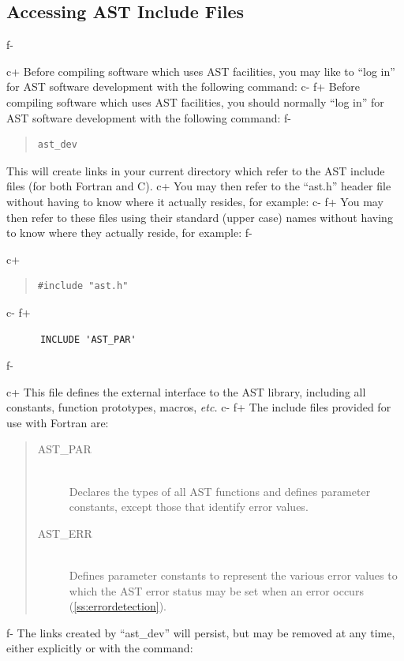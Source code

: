\documentclass[twoside,11pt]{article}
\newcommand{\secref}[1]{\S\ref{#1}}
\renewcommand{\secref}[1]{\ref{#1}}
\begin{document}
\subsection{\label{ss:accessingheaderfile}Accessing AST Include Files}
f-

c+
Before compiling software which uses AST facilities, you may like to
``log in'' for AST software development with the following command:
c-
f+
Before compiling software which uses AST facilities, you should
normally ``log in'' for AST software development with the following
command:
f-

\begin{quote}
\small
\begin{verbatim}
ast_dev
\end{verbatim}
\normalsize
\end{quote}

This will create links in your current directory which refer to the
AST include files (for both Fortran and C).
c+
You may then refer to the ``ast.h'' header file without having to know
where it actually resides, for example:
c-
f+
You may then refer to these files using their standard (upper case)
names without having to know where they actually reside, for example:
f-

c+
\begin{quote}
\small
\begin{verbatim}
#include "ast.h"
\end{verbatim}
\normalsize
\end{quote}
c-
f+
\small
\begin{verbatim}
      INCLUDE 'AST_PAR'
\end{verbatim}
\normalsize
f-

c+
This file defines the external interface to the AST library, including
all constants, function prototypes, macros, {\em{etc.}}
c-
f+
The include files provided for use with Fortran are:

\begin{quote}
\begin{description}
\item[AST\_PAR]\mbox{}\\
Declares the types of all AST functions and defines parameter
constants, except those that identify error values.

\item[AST\_ERR]\mbox{}\\
Defines parameter constants to represent the various error values to
which the AST error status may be set when an error occurs
(\secref{ss:errordetection}).
\end{description}
\end{quote}
f-
The links created by ``ast\_dev'' will persist, but may be removed at
any time, either explicitly or with the command:
\end{document}
